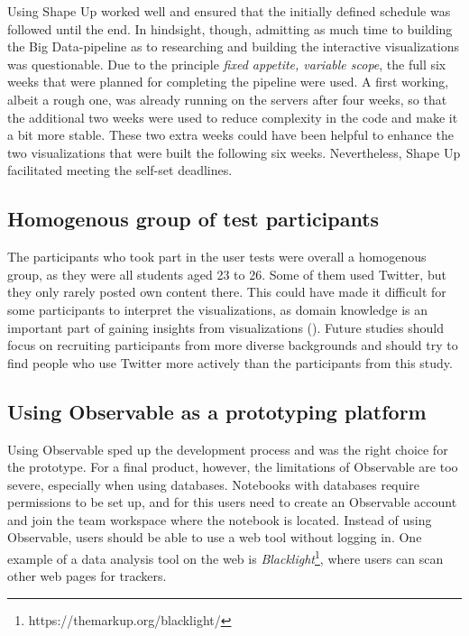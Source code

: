 Using Shape Up worked well and ensured that the initially defined schedule was followed until the end. In hindsight, though, admitting as much time to building the Big Data-pipeline as to researching and building the interactive visualizations was questionable. Due to the principle \emph{fixed appetite, variable scope}, the full six weeks that were planned for completing the pipeline were used. A first working, albeit a rough one, was already running on the   servers after four weeks, so that the additional two weeks were used to reduce complexity in the code and make it a bit more stable. These two extra weeks could have been helpful to enhance the two visualizations that were built the following six weeks. Nevertheless, Shape Up facilitated meeting the self-set deadlines.

\subsection*{Homogenous group of test participants}
The participants who took part in the user tests were overall a homogenous group, as they were all students aged 23 to 26. Some of them used Twitter, but they only rarely posted own content there. This could have made it difficult for some participants to interpret the visualizations, as domain knowledge is an important part of gaining insights from visualizations (\cite{northMeasuringVisualizationInsight2006}). Future studies should focus on recruiting participants from more diverse backgrounds and should try to find people who use Twitter more actively than the participants from this study.

\subsection*{Using Observable as a prototyping platform}
Using Observable sped up the development process and was the right choice for the prototype. For a final product, however, the limitations of Observable are too severe, especially when using databases. Notebooks with databases require permissions to be set up, and for this users need to create an Observable account and join the team workspace where the notebook is located. Instead of using Observable, users should be able to use a web tool without logging in. One example of a data analysis tool on the web is \emph{Blacklight}\footnote{https://themarkup.org/blacklight/}, where users can scan other web pages for trackers.

